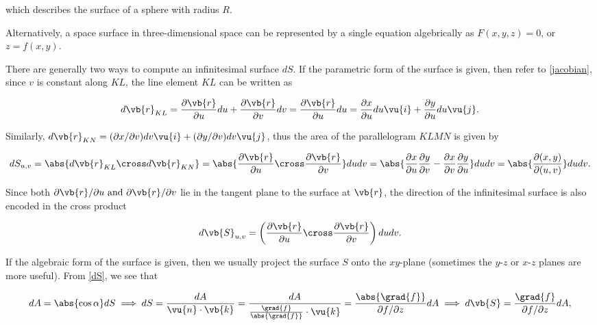 \documentclass[english,a4paper,12pt]{report}
\begin{document}
which describes the surface of a sphere with radius \(R\).

Alternatively, a space surface in three-dimensional space can be represented by a single equation algebrically as \(F(x,y,z) = 0\), or \(z = f(x,y)\).  

There are generally two ways to compute an infinitesimal surface \(dS\). If the parametric form of the surface is given, then refer to \cref{jacobian}, since \(v\) is constant along \(KL\), the line element \(KL\) can be written as 

\begin{equation}
	d\vb{r} _{KL} = \frac{\partial \vb{r} }{\partial u}du+ \frac{\partial \vb{r} }{\partial v}dv = \frac{\partial \vb{r} }{\partial u}du = \frac{\partial x}{\partial u} du \vu{i} + \frac{\partial y}{\partial u} du \vu{j}.
\end{equation}

Similarly, \(d\vb{r} _{KN}  = (\partial x / \partial v) dv \vu{i} + (\partial y/\partial v)dv \vu{j}\), thus the area of the parallelogram \(KLMN\) is given by

\begin{equation}
	dS_{u,v} = \abs{d\vb{r} _{KL} \cross  d\vb{r} _{KN}} = \abs{\frac{\partial \vb{r} }{\partial u} \cross \frac{\partial \vb{r} }{\partial v} }dudv = \abs{\frac{\partial x}{\partial u} \frac{\partial y}{\partial v}  - \frac{\partial x}{\partial v}  \frac{\partial y}{\partial u} }dudv = \abs{\frac{\partial (x,y)}{\partial (u,v)} } dudv.
\end{equation}

Since both \(\partial \vb{r} /\partial u \text { and } \partial \vb{r} /\partial v  \) lie in the tangent plane to the surface at \(\vb{r} \), the direction of the infinitesimal surface is also encoded in the cross product

\begin{equation}
	d\vb{S} _{u,v} =\left( \frac{\partial \vb{r} }{\partial u} \cross \frac{\partial \vb{r} }{\partial v} \right) dudv.   
\end{equation}



If the algebraic form of the surface is given, then we usually project the surface \(S\) onto the \(xy\)-plane (sometimes the \(y\)-\(z\) or \(x\)-\(z\) planes are more useful). From \cref{dS}, we see that 

\begin{equation} \label{dseq} 
	dA = \abs{\cos \alpha }dS \implies dS = \frac{dA}{\vu{n} \cdot \vb{k} } = \frac{dA}{\frac{\grad{f} }{\abs{\grad{f} } } \cdot \vu{k}  } =  \frac{\abs{\grad{f} } }{\partial f/\partial z}dA \implies d\vb{S} = \frac{\grad{f}}{\partial f/\partial z } dA, 
\end{equation}
\end{document}
